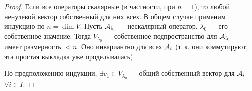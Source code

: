 \begin{proof}
    Если все операторы скалярные (в частности, при $n = 1$), то любой ненулевой вектор собственный для них всех. В общем случае применим индукцию по $n = \dim V$. Пусть $\mathcal{A}_{i_0}$ --- нескалярный оператор, $\lambda_0$ --- его собственное значение. Тогда $V_{\lambda_0}$ --- собственное подпространство для $\mathcal{A}_{i_0}$ --- имеет размерность $< n$. Оно инвариантно для всех $\mathcal{A}_i$ (т.\,к. они коммутируют, эта простая выкладка уже проделывалась).

    По предположению индукции, $\exists v_1 \in V_{\lambda_0}$ --- общий собственный вектор для $\mathcal{A}_i$ $\forall i \in I$.
\end{proof}

